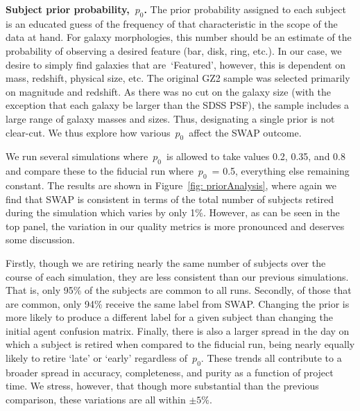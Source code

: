 \documentclass[twocolumn]{aastex6}
\newcommand{\p}{$p_0$}
\newcommand{\feat}{`Featured'}
\begin{document}
\textbf{Subject prior probability,~\p.}
The prior probability assigned to each subject is an educated guess of 
the frequency of that characteristic in the scope of the data at hand. 
For galaxy morphologies, this number should be an estimate of the probability
of observing a desired feature (bar, disk, ring, etc.). In our case, 
we desire to simply find galaxies that are~\feat, however, this is dependent 
on mass, redshift, physical size, etc. The original GZ2 sample was selected
primarily on magnitude and redshift.  As there was no cut on the galaxy size
(with the exception that each galaxy be larger than the SDSS PSF), the sample
includes a large range of galaxy masses and sizes. Thus, designating a single 
prior is not clear-cut. We thus explore how various~\p~affect the SWAP outcome.

We run several simulations where~\p~is allowed to take values 0.2, 0.35, and 0.8 
and compare these to the fiducial run where~\p~= 0.5, everything else remaining constant.
The results are shown in Figure~\ref{fig: priorAnalysis}, where again we find that 
SWAP is consistent in terms of the total number of subjects retired 
during the simulation which varies by only 1\%. 
However, as can be seen in the top panel, the variation in our quality metrics is 
more pronounced and deserves some discussion. 

Firstly, though we are retiring nearly the same number of subjects over the course
of each simulation, they are less consistent than our previous simulations. That is, 
only 95\% of the subjects are common to all runs. Secondly, of those that are 
common, only 94\% receive the same label from SWAP. Changing the prior is more
likely to produce a different label for a given subject than changing the initial 
agent confusion matrix. Finally, there is also a larger spread in the day on which 
a subject is retired when compared to the fiducial run, being nearly equally likely to 
retire `late' or `early' regardless of~\p. These trends all contribute to a broader 
spread in accuracy, completeness, and purity as a function of project time.
We stress, however, that though more substantial than the previous comparison, 
these variations are all within $\pm5\%$. 
\end{document}

